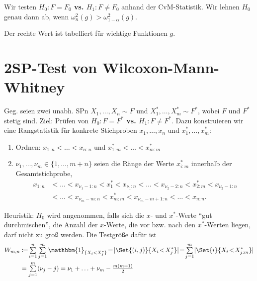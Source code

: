\documentclass{cheat-sheet}
\newcommand{\ind}{\mathbbm{1}} %
\newcommand{\testh}[1]{\textcolor{TestColor}{\textbf{#1}}}
\begin{document}
\begin{entscheidungsregel}
  Wir testen \testh{$H_0 : F = F_0$ vs. $H_1 : F \neq F_0$} anhand der CvM-Statistik.
  Wir lehnen $H_0$ genau dann ab, wenn $\omega_n^2(g) > \omega_{1-\alpha}^2(g)$.
\end{entscheidungsregel}

\begin{bem}
  Der rechte Wert ist tabelliert für wichtige Funktionen $g$.
\end{bem}

\section{2SP-Test von Wilcoxon-Mann-Whitney} %



\begin{situation}
  Geg. seien zwei unabh. SPn $X_1, \ldots, X_n \sim F$ und $X_1^{*}, \ldots, X_m^{*} \sim F^{*}$, wobei $F$ und $F^*$ stetig sind.
  Ziel: Prüfen von \testh{$H_0 : F = F^{*}$ vs. $H_1 : F \neq F^{*}$}.
  Dazu konstruieren wir eine Rangstatistik für konkrete Stichproben $x_1, \ldots, x_n$ und $x_1^{*}, \ldots, x_m^{*}$:
  \begin{enumerate}
    \item Ordnen: $x_{1:n} < \ldots < x_{n:n}$ und $x_{1:m}^{*} < \ldots < x_{m:m}^{*}$
    \item $\nu_1, \ldots, \nu_m \in \{ 1, \ldots, m+n \}$ seien die Ränge der Werte $x_{i:m}^{*}$ innerhalb der Gesamtstichprobe, \dh{}
    \begin{align*}
      x_{1:n} & \!<\! \ldots \!<\! x_{\nu_1 - 1:n} \!<\! x_1^{*} \!<\! x_{\nu_1:n} \!<\! \ldots \!<\! x_{\nu_2 - 2:n} \!<\! x_{2:m}^{*} < x_{\nu_2 - 1:n} \\
      & < \ldots < x_{\nu_m-m:n} < x_{m:m}^{*} < x_{\nu_m - m + 1 : n} < \ldots < x_{n:n}.
    \end{align*}
  \end{enumerate}
  Heuristik: $H_0$ wird angenommen, falls sich die $x$- und $x^{*}$-Werte "`gut durchmischen"', \dh{} die Anzahl der $x$-Werte, die vor bzw. nach den $x^{*}$-Werten liegen, darf nicht zu groß werden.
  Die Testgröße dafür ist
  \begin{align*}
    W_{m,n} & \coloneqq \! \sum_{i=1}^n \sum_{j=1}^m \ind_{\{ X_i < X_j^{*} \}} \!=\! \abs{\Set{(i, j)}{ X_i \!<\! X_j^{*}}} \!=\! \sum_{j=1}^m \abs{\Set{i}{X_i \!<\! X_{j:m}^{*}}} \\
    & = \sum_{j=1}^m (\nu_j - j) = \nu_1 + \ldots + \nu_m - \tfrac{m (m+1)}{2}
  \end{align*}
\end{situation}
\end{document}
